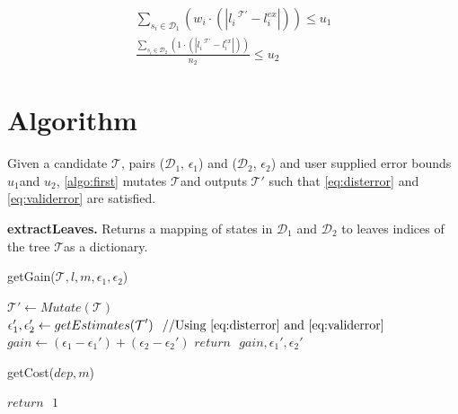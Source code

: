 \documentclass{llncs}
\newcommand{\candidate}{$\mathcal{T}$}
\newcommand{\distdata}{$\mathcal{D}_1$}
\newcommand{\validata}{$\mathcal{D}_2$}
\newcommand{\userrdist}{$u_1$}
\newcommand{\userrvalid}{$u_2$}
\begin{document}
\begin{align}
	& \sum_{s_i \in \mathcal{D}_1}(w_i \cdot (|l_i^{\text{ \candidate}'} - l_i^{ex}|)) \leq \text{\userrdist}  \label{eq:disterror}& \\
	& \frac{\sum_{s_i \in \mathcal{D}_2}(1 \cdot (|l_i^{\text{ \candidate}'} - l_i^{ex}|))}{n_2} \leq \text{\userrvalid} \label{eq:validerror} &
\end{align}


\section{Algorithm}

Given a candidate $\text{\candidate}$, pairs (\distdata, $\epsilon_1$) and (\validata, $\epsilon_2$) and user supplied error bounds \userrdist and \userrvalid, \cref{algo:first} mutates \candidate and outputs $\text{\candidate}'$ such that \cref{eq:disterror} and \cref{eq:validerror} are satisfied.

\textbf{extractLeaves.} Returns a mapping of states in $\text{\distdata}$ and $\text{\validata}$ to leaves indices of the tree \candidate as a dictionary.



\begin{algorithm}
	\caption{getGain($\text{\candidate}, l, m, \epsilon_1, \epsilon_2$)}
	\label{algo:gain}
	\begin{algorithmic}[1]
		\State $\text{\candidate}' \gets Mutate(\text{\candidate})$
		\State $\epsilon_1', \epsilon_2' \gets getEstimates(\text{\candidate}') \text{\hspace{0.1 in}//Using \cref{eq:disterror} and \cref{eq:validerror}}$
		\State $gain \gets (\epsilon_1 - \epsilon_1') + (\epsilon_2 - \epsilon_2')$
		\State $return \text{ } gain, \epsilon_1', \epsilon_2'$		
	\end{algorithmic}
\end{algorithm}


\begin{algorithm}
	\caption{getCost($dep, m$)}
	\label{algo:cost}
	\begin{algorithmic}[1]
		\State $return \text{ } 1$		
	\end{algorithmic}
\end{algorithm}
\end{document}
